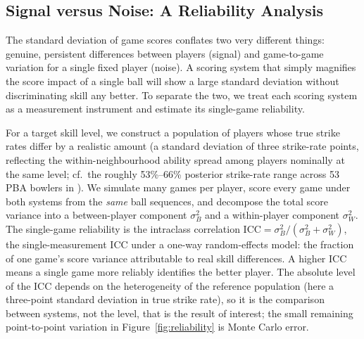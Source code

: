 \documentclass[USenglish]{article}
\theoremstyle{dgthm}
\theoremstyle{dgdef}
\begin{document}
\subsection{Signal versus Noise: A Reliability Analysis}

The standard deviation of game scores conflates two very different things: genuine, persistent differences between players (signal) and game-to-game variation for a single fixed player (noise). A scoring system that simply magnifies the score impact of a single ball will show a large standard deviation without discriminating skill any better. To separate the two, we treat each scoring system as a measurement instrument and estimate its single-game reliability.

For a target skill level, we construct a population of players whose true strike rates differ by a realistic amount (a standard deviation of three strike-rate points, reflecting the within-neighbourhood ability spread among players nominally at the same level; cf.\ the roughly 53\%--66\% posterior strike-rate range across 53 PBA bowlers in \citet{vanderwerken2018}). We simulate many games per player, score every game under both systems from the \emph{same} ball sequences, and decompose the total score variance into a between-player component $\sigma_B^2$ and a within-player component $\sigma_W^2$. The single-game reliability is the intraclass correlation $\text{ICC} = \sigma_B^2 / (\sigma_B^2 + \sigma_W^2)$, the single-measurement ICC under a one-way random-effects model: the fraction of one game's score variance attributable to real skill differences. A higher ICC means a single game more reliably identifies the better player. The absolute level of the ICC depends on the heterogeneity of the reference population (here a three-point standard deviation in true strike rate), so it is the comparison between systems, not the level, that is the result of interest; the small remaining point-to-point variation in Figure~\ref{fig:reliability} is Monte Carlo error.
\end{document}
